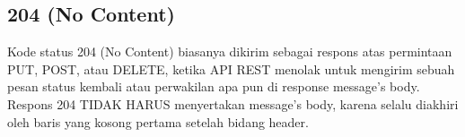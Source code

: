 \documentclass[12pt,a4paper]{article}
\begin{document}
\subsection{204 (No Content)}
Kode status 204 (No Content) biasanya dikirim sebagai respons atas permintaan PUT, POST, atau DELETE, ketika API REST menolak untuk mengirim sebuah pesan status kembali atau perwakilan apa pun di response message’s body.\\
Respons 204 TIDAK HARUS menyertakan message’s body, karena selalu diakhiri oleh baris yang kosong pertama setelah bidang header.
\end{document}
